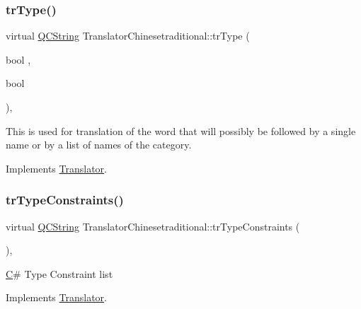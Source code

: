\subsubsection{\texorpdfstring{trType()}{trType()}}
{\footnotesize\ttfamily virtual \mbox{\hyperlink{class_q_c_string}{Q\+C\+String}} Translator\+Chinesetraditional\+::tr\+Type (\begin{DoxyParamCaption}\item[{bool}]{,  }\item[{bool}]{ }\end{DoxyParamCaption})\hspace{0.3cm}{\ttfamily [inline]}, {\ttfamily [virtual]}}

This is used for translation of the word that will possibly be followed by a single name or by a list of names of the category. 

Implements \mbox{\hyperlink{class_translator}{Translator}}.

\mbox{\label{class_translator_chinesetraditional_a5aae69c493e0af811754cbcb0e553a5d}} 
\subsubsection{\texorpdfstring{trTypeConstraints()}{trTypeConstraints()}}
{\footnotesize\ttfamily virtual \mbox{\hyperlink{class_q_c_string}{Q\+C\+String}} Translator\+Chinesetraditional\+::tr\+Type\+Constraints (\begin{DoxyParamCaption}{ }\end{DoxyParamCaption})\hspace{0.3cm}{\ttfamily [inline]}, {\ttfamily [virtual]}}

\mbox{\hyperlink{class_c}{C}}\# Type Constraint list 

Implements \mbox{\hyperlink{class_translator}{Translator}}.

\mbox{\label{class_translator_chinesetraditional_a6aaadc23c3996b49a87da3b5aa23e099}} 

